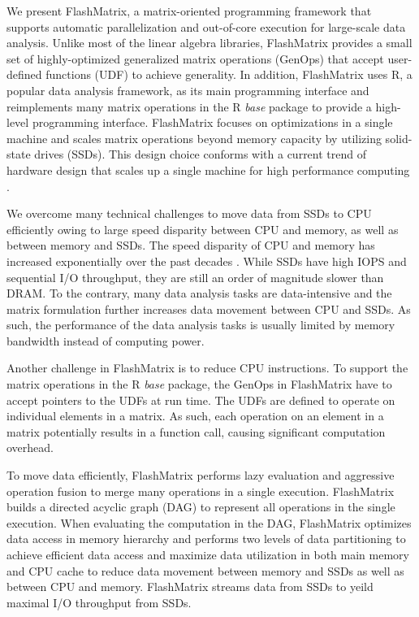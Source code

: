 
We present FlashMatrix, a matrix-oriented programming framework that supports
automatic parallelization and out-of-core execution for large-scale data analysis.
Unlike most of the linear algebra libraries, FlashMatrix provides a small
set of highly-optimized generalized matrix operations (GenOps) that accept
user-defined functions (UDF) to achieve generality. In addition, FlashMatrix
uses R, a popular data analysis framework, as its main programming interface
and reimplements many matrix operations in the R \textit{base} package to provide
a high-level programming interface. FlashMatrix focuses on optimizations in
a single machine and scales matrix operations beyond memory capacity by utilizing
solid-state drives (SSDs). This design choice conforms with a current trend of
hardware design that scales up a single machine for high performance computing
\cite{Ang14}.


We overcome many technical challenges to move data from SSDs to CPU efficiently
owing to large speed disparity between CPU and memory, as well as between memory and
SSDs. The speed disparity of CPU and memory has increased exponentially over
the past decades \cite{Wilkes01}. While SSDs have high IOPS and sequential
I/O throughput, they are still an order of magnitude slower than DRAM.
To the contrary, many data analysis tasks are data-intensive and the matrix
formulation further increases data movement between CPU and SSDs. As such,
the performance of the data analysis tasks is usually limited by memory
bandwidth instead of computing power.

Another challenge in FlashMatrix is to reduce CPU instructions. To support
the matrix operations in the R \textit{base} package, the GenOps in FlashMatrix
have to accept pointers to the UDFs at run time. The UDFs are defined to
operate on individual elements in a matrix. As such, each operation on an element
in a matrix potentially results in a function call, causing significant
computation overhead.

To move data efficiently, FlashMatrix performs lazy evaluation and aggressive
operation fusion to merge many operations in a single execution.
FlashMatrix builds a directed acyclic graph (DAG) to represent all operations
in the single execution. When evaluating the computation in the DAG, FlashMatrix
optimizes data access in memory hierarchy and performs two levels of data
partitioning to achieve efficient data access and maximize data utilization in
both main memory and CPU cache to reduce data movement between memory and SSDs
as well as between CPU and memory. FlashMatrix streams data from SSDs to yeild
maximal I/O throughput from SSDs.

